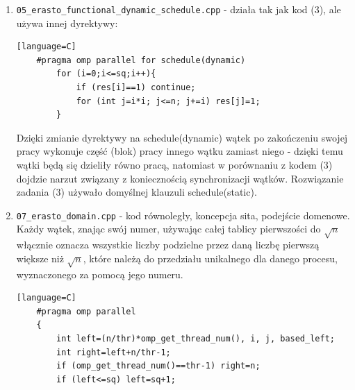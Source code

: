 \documentclass[12pt]{article}
\begin{document}
\begin {enumerate}
	\item \texttt{05\_erasto\_functional\_dynamic\_schedule.cpp} - działa tak jak kod (3), ale używa innej dyrektywy:
	\begin{lstlisting}[style=mystyle, caption= Sito funkcyjne z dynamic schedulingiem][language=C]
	#pragma omp parallel for schedule(dynamic)
		for (i=0;i<=sq;i++){
			if (res[i]==1) continue;
			for (int j=i*i; j<=n; j+=i) res[j]=1;
		}
	\end{lstlisting}
	Dzięki zmianie dyrektywy na schedule(dynamic) wątek po zakończeniu swojej pracy wykonuje część (blok) pracy innego wątku zamiast niego - dzięki temu wątki będą się dzieliły równo pracą, natomiast w porównaniu z kodem (3) dojdzie narzut związany z koniecznością synchronizacji wątków. Rozwiązanie zadania (3) używało domyślnej klauzuli schedule(static).
	
	\item \texttt{07\_erasto\_domain.cpp} - kod równoległy, koncepcja sita, podejście domenowe. Każdy wątek, znając swój numer, używając całej tablicy pierwszości do \(\sqrt{n}\) włącznie oznacza wszystkie liczby podzielne przez daną liczbę pierwszą większe niż \(\sqrt{n}\), które należą do przedziału unikalnego dla danego procesu, wyznaczonego za pomocą jego numeru.
	\begin{lstlisting}[style=mystyle, caption= Sito funkcyjne z dynamic schedulingiem][language=C]
	#pragma omp parallel
	{
		int left=(n/thr)*omp_get_thread_num(), i, j, based_left;
		int right=left+n/thr-1;
		if (omp_get_thread_num()==thr-1) right=n;
		if (left<=sq) left=sq+1;
		

\end{lstlisting}
\end{enumerate}
\end{document}
